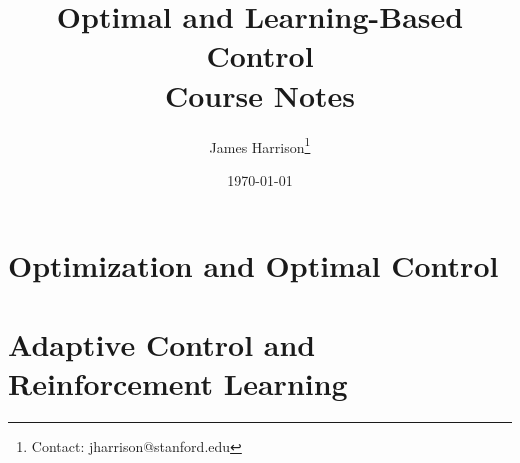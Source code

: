 \documentclass[12pt]{book}
\title{Optimal and Learning-Based Control\\
Course Notes}
\author{James Harrison\thanks{Contact: jharrison@stanford.edu}}
\date{\today}
\begin{document}
\maketitle




\newpage
\tableofcontents

\newpage


\part{Optimization and Optimal Control}







\part{Adaptive Control and Reinforcement Learning}






% 

% 
% 




\end{document}
